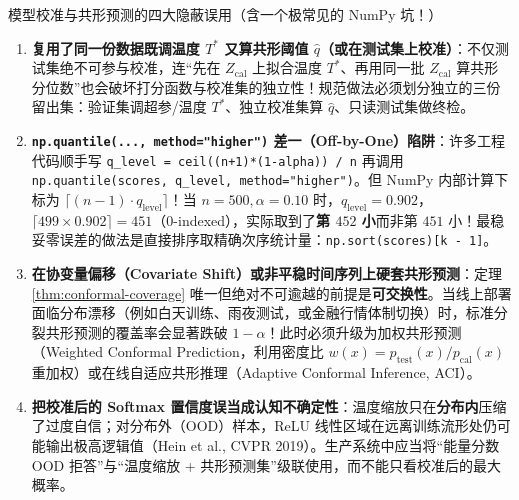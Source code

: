 \begin{failBox}{模型校准与共形预测的四大隐蔽误用（含一个极常见的 NumPy 坑！）}
\begin{enumerate}
  \item \textbf{复用了同一份数据既调温度 $T^*$ 又算共形阈值 $\hat{q}$（或在测试集上校准）}：不仅测试集绝不可参与校准，连“先在 $Z_{\text{cal}}$ 上拟合温度 $T^*$、再用同一批 $Z_{\text{cal}}$ 算共形分位数”也会破坏打分函数与校准集的独立性！规范做法必须划分独立的三份留出集：验证集调超参/温度 $T^*$、独立校准集算 $\hat{q}$、只读测试集做终检。
  \item \textbf{\texttt{np.quantile(..., method="higher")} 差一（Off-by-One）陷阱}：许多工程代码顺手写 \texttt{q\_level = ceil((n+1)*(1-alpha)) / n} 再调用 \texttt{np.quantile(scores, q\_level, method="higher")}。但 NumPy 内部计算下标为 $\lceil (n-1)\cdot q_{\text{level}} \rceil$！当 $n=500,\alpha=0.10$ 时，$q_{\text{level}}=0.902$，$\lceil 499 \times 0.902 \rceil = 451$（0-indexed），实际取到了\textbf{第 $452$ 小}而非第 $451$ 小！最稳妥零误差的做法是直接排序取精确次序统计量：\texttt{np.sort(scores)[k - 1]}。
  \item \textbf{在协变量偏移（Covariate Shift）或非平稳时间序列上硬套共形预测}：定理 \ref{thm:conformal-coverage} 唯一但绝对不可逾越的前提是\textbf{可交换性}。当线上部署面临分布漂移（例如白天训练、雨夜测试，或金融行情体制切换）时，标准分裂共形预测的覆盖率会显著跌破 $1-\alpha$！此时必须升级为加权共形预测（Weighted Conformal Prediction，利用密度比 $w(x) = p_{\text{test}}(x)/p_{\text{cal}}(x)$ 重加权）或在线自适应共形推理（Adaptive Conformal Inference, ACI）。
  \item \textbf{把校准后的 Softmax 置信度误当成认知不确定性}：温度缩放只在\textbf{分布内}压缩了过度自信；对分布外（OOD）样本，ReLU 线性区域在远离训练流形处仍可能输出极高逻辑值（Hein et al., CVPR 2019）。生产系统中应当将“能量分数 OOD 拒答”与“温度缩放 + 共形预测集”级联使用，而不能只看校准后的最大概率。
\end{enumerate}
\end{failBox}

